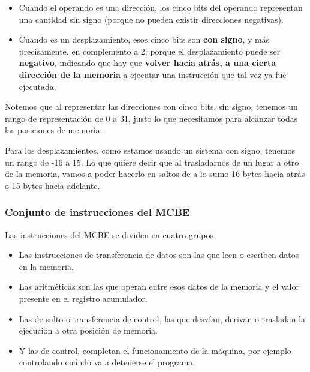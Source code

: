 \documentclass[spanish,A4,]{article}
\begin{document}
\begin{itemize}
\itemsep1pt\parskip0pt
\item
  Cuando el operando es una dirección, los cinco bits del operando
  representan una cantidad sin signo (porque no pueden existir
  direcciones negativas).
\item
  Cuando es un desplazamiento, esos cinco bits son \textbf{con signo}, y
  más precisamente, en complemento a 2; porque el desplazamiento puede
  ser \textbf{negativo}, indicando que hay que \textbf{volver hacia
  atrás, a una cierta dirección de la memoria} a ejecutar una
  instrucción que tal vez ya fue ejecutada.
\end{itemize}

Notemos que al representar las direcciones con cinco bits, sin signo,
tenemos un rango de representación de 0 a 31, justo lo que necesitamos
para alcanzar todas las posiciones de memoria.

Para los desplazamientos, como estamos usando un sistema con signo,
tenemos un rango de -16 a 15. Lo que quiere decir que al trasladarnos de
un lugar a otro de la memoria, vamos a poder hacerlo en saltos de a lo
sumo 16 bytes hacia atrás o 15 bytes hacia adelante.

\subsubsection{Conjunto de instrucciones del
MCBE}\label{conjunto-de-instrucciones-del-mcbe}

Las instrucciones del MCBE se dividen en cuatro grupos.

\begin{itemize}
\itemsep1pt\parskip0pt
\item
  Las instrucciones de transferencia de datos son las que leen o
  escriben datos en la memoria.\\
\item
  Las aritméticas son las que operan entre esos datos de la memoria y el
  valor presente en el registro acumulador.\\
\item
  Las de salto o transferencia de control, las que desvían, derivan o
  trasladan la ejecución a otra posición de memoria.\\
\item
  Y las de control, completan el funcionamiento de la máquina, por
  ejemplo controlando cuándo va a detenerse el programa.
\end{itemize}
\end{document}
